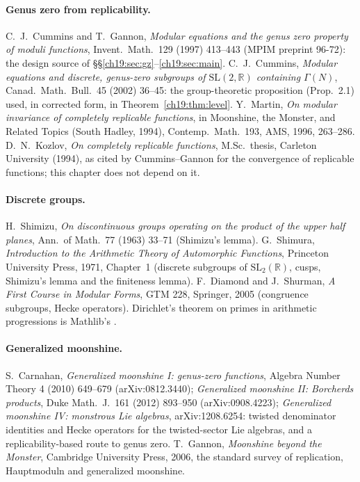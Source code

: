 \paragraph{Genus zero from replicability.}  C.~J.~Cummins and T.~Gannon, \emph{Modular equations and the genus zero property of moduli
functions}, Invent.\ Math.\ 129 (1997) 413--443 (MPIM preprint 96-72): the design source of \S\S\ref{ch19:sec:gz}--\ref{ch19:sec:main}.
C.~J.~Cummins, \emph{Modular equations and discrete, genus-zero subgroups of $\mathrm{SL}(2,\mathbb R)$ containing $\Gamma(N)$}, Canad.\ Math.\
Bull.\ 45 (2002) 36--45: the group-theoretic proposition (Prop.~2.1) used, in corrected form, in Theorem~\ref{ch19:thm:level}.  Y.~Martin, \emph{On
modular invariance of completely replicable functions}, in Moonshine, the Monster, and Related Topics (South Hadley, 1994), Contemp.\ Math.\
193, AMS, 1996, 263--286.  D.~N.~Kozlov, \emph{On completely replicable functions}, M.Sc.\ thesis, Carleton University (1994), as cited by
Cummins--Gannon for the convergence of replicable functions; this chapter does not depend on it.

\paragraph{Discrete groups.}  H.~Shimizu, \emph{On discontinuous groups operating on the product of the upper half planes}, Ann.\ of Math.\ 77
(1963) 33--71 (Shimizu's lemma).  G.~Shimura, \emph{Introduction to the Arithmetic Theory of Automorphic Functions}, Princeton University Press,
1971, Chapter~1 (discrete subgroups of $\mathrm{SL}_2(\mathbb R)$, cusps, Shimizu's lemma and the finiteness lemma).  F.~Diamond and J.~Shurman,
\emph{A First Course in Modular Forms}, GTM 228, Springer, 2005 (congruence subgroups, Hecke operators).  Dirichlet's theorem on primes in
arithmetic progressions is Mathlib's \lean{Nat.forall_exists_prime_gt_and_eq_mod}.

\paragraph{Generalized moonshine.}  S.~Carnahan, \emph{Generalized moonshine I: genus-zero functions}, Algebra Number Theory 4 (2010) 649--679
(arXiv:0812.3440); \emph{Generalized moonshine II: Borcherds products}, Duke Math.\ J.\ 161 (2012) 893--950 (arXiv:0908.4223); \emph{Generalized
moonshine IV: monstrous Lie algebras}, arXiv:1208.6254: twisted denominator identities and Hecke operators for the twisted-sector Lie algebras,
and a replicability-based route to genus zero.  T.~Gannon, \emph{Moonshine beyond the Monster}, Cambridge University Press, 2006, the standard survey of
replication, Hauptmoduln and generalized moonshine.

